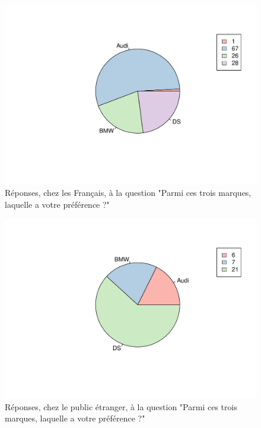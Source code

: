 \documentclass[12pt]{article}\usepackage[]{graphicx}\usepackage[]{color}
\makeatletter
\def\maxwidth{ %
  \ifdim\Gin@nat@width>\linewidth
    \linewidth
  \else
    \Gin@nat@width
  \fi
}
\newenvironment{knitrout}{}{} %
\makeatother
\begin{document}
\begin{knitrout}
\color{fgcolor}\begin{figure}[H]
\includegraphics[width=\maxwidth]{figure/preference_fr-1} \caption[Réponses, chez les Français, à la question "Parmi ces trois marques, laquelle a votre préférence ?"]{Réponses, chez les Français, à la question "Parmi ces trois marques, laquelle a votre préférence ?"}\label{fig:preference fr}

\end{figure}


\end{knitrout}

\begin{knitrout}
\color{fgcolor}\begin{figure}[H]
\includegraphics[width=\maxwidth]{figure/preference_en-1} \caption[Réponses, chez le public étranger, à la question "Parmi ces trois marques, laquelle a votre préférence ?"]{Réponses, chez le public étranger, à la question "Parmi ces trois marques, laquelle a votre préférence ?"}\label{fig:preference en}
\end{figure}


\end{knitrout}
\end{document}
